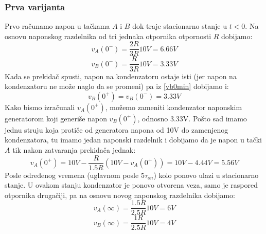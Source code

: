 \documentclass{article}
\begin{document}
            \subsubsection{Prva varijanta}
                Prvo računamo napon u tačkama $A$ i $B$ dok traje stacionarno stanje u $t < 0$. Na osnovu naponskog razdelnika od tri jednaka otpornika otpornosti $R$ dobijamo:
                \begin{equation}
                    \label{va0min}
                    v_A(0^{-}) = \frac{2R}{3R} 10V = 6.66V
                \end{equation}
                \begin{equation}
                    \label{vb0min}
                    v_B(0^{-}) = \frac{R}{3R} 10V = 3.33V
                \end{equation}
                Kada se prekidač spusti, napon na kondenzatoru ostaje isti (jer napon na kondenzatoru ne može naglo da se promeni) pa iz \eqref{vb0min} dobijamo i:
                \begin{equation}
                    \label{vb0}
                    v_B(0^{+}) = v_B(0^{-}) = 3.33V
                \end{equation}
                Kako bismo izračunali $v_A(0^{+})$, možemo zameniti kondenzator naponskim generatorom koji generiše napon $v_B(0^{+})$, odnosno 3.33V. Pošto sad imamo jednu struju koja protiče od generatora napona od 10V do zamenjenog kondenzatora, tu imamo jedan naponski razdelnik i dobijamo da je napon u tački $A$ tik nakon zatvaranja prekidača jednak:
                \begin{equation}
                    \label{va0}
                    v_A(0^{+}) = 10V - \frac{R}{1.5R} (10V - v_A(0^{+})) = 10V - 4.44V = 5.56V
                \end{equation}
                Posle određenog vremena (uglavnom posle $5\tau_{on}$) kolo ponovo ulazi u stacionarno stanje. U ovakom stanju kondenzator je ponovo otvorena veza, samo je raspored otpornika drugačiji, pa na osnovu novog naponskog razdelnika dobijamo:
                \begin{equation}
                    \label{vainf}
                    v_A(\infty) = \frac{1.5R}{2.5R} 10V = 6V
                \end{equation}
                \begin{equation}
                    \label{vbinf}
                    v_B(\infty) = \frac{1R}{2.5R} 10V = 4V
                \end{equation}
\end{document}
